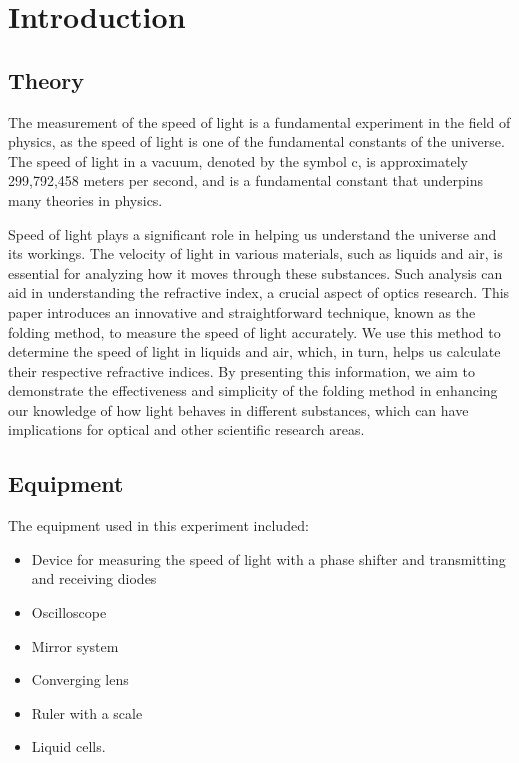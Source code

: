 \section{Introduction}

\subsection{Theory}
The measurement of the speed of light is a fundamental experiment in the field of physics, as the speed of light is one of the fundamental constants of the universe. The speed of light in a vacuum, denoted by the symbol c, is approximately 299,792,458 meters per second, and is a fundamental constant that underpins many theories in physics. 

Speed of light plays a significant role in helping us understand the universe and its workings. The velocity of light in various materials, such as liquids and air, is essential for analyzing how it moves through these substances. Such analysis can aid in understanding the refractive index, a crucial aspect of optics research. This paper introduces an innovative and straightforward technique, known as the folding method, to measure the speed of light accurately. We use this method to determine the speed of light in liquids and air, which, in turn, helps us calculate their respective refractive indices. By presenting this information, we aim to demonstrate the effectiveness and simplicity of the folding method in enhancing our knowledge of how light behaves in different substances, which can have implications for optical and other scientific research areas.


\subsection{Equipment}
The equipment used in this experiment included:
\begin{itemize}
	\item Device for measuring the speed of light with a phase shifter and transmitting and receiving diodes
	\item Oscilloscope
	\item Mirror system
	\item Converging lens
	\item Ruler with a scale
	\item Liquid cells.
\end{itemize}


